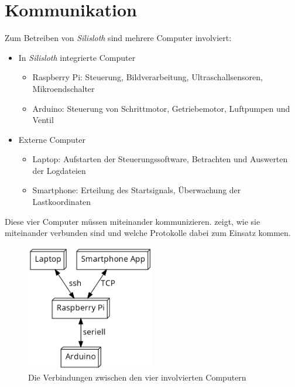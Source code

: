 \section{Kommunikation}
\label{sec:kommunikation}

Zum Betreiben von \textit{Silisloth} sind mehrere Computer involviert:

\begin{itemize}
    \item In \textit{Silisloth} integrierte Computer
        \begin{itemize}
            \item Raspberry Pi: Steuerung, Bildverarbeitung, Ultraschallsensoren, Mikroendschalter
            \item Arduino: Steuerung von Schrittmotor, Getriebemotor, Luftpumpen und Ventil
        \end{itemize}
    \item Externe Computer
        \begin{itemize}
            \item Laptop: Aufstarten der Steuerungssoftware, Betrachten und Auswerten der Logdateien
            \item Smartphone: Erteilung des Startsignals, Überwachung der Lastkoordinaten
        \end{itemize}
\end{itemize}

Diese vier Computer müssen miteinander kommunizieren.  zeigt, wie sie miteinander verbunden sind und welche Protokolle dabei zum Einsatz kommen.

\begin{figure}[H]
    \centering
    \includegraphics[width=0.5\textwidth]{graphs/rechennetzwerk.png}
    \caption{Die Verbindungen zwischen den vier involvierten Computern}
    \label{fig:rechennetzwerk}
\end{figure}

